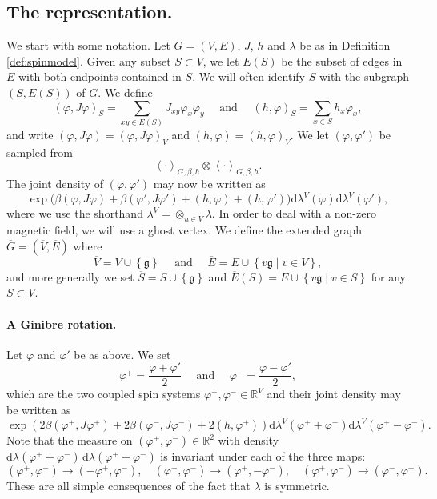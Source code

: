 \documentclass{article}
\numberwithin{equation}{section}
\theoremstyle{definition}
\theoremstyle{definition}
\theoremstyle{remark}
\renewcommand{\d}{\mathrm{d}}
\newcommand\vp{\varphi}
\newcommand\R{\mathbb{R}}
\renewcommand{\d}{\mathrm{d}}
\renewcommand{\l}{\lambda}
\newcommand{\vpp}{\vp^+}
\newcommand{\vpm}{\vp^-}
\newcommand{\g}{\mathfrak{g}}
\begin{document}
\subsection{The representation. }We start with some notation. 
Let $G = (V,E)$, $J$, $h$ and $\l$ be as in Definition \ref{def:spinmodel}.
Given any subset $S \subset V$, we let $E(S)$ be the subset of edges in $E$ with both endpoints contained in $S$. We will often identify $S$ with the subgraph $(S,E(S))$ of $G$. We define
\[
\left( \vp, J \vp \right)_S = \sum_{xy \in E(S)} J_{xy} \vp_x \vp_y \quad\text{ and }\quad (h,\vp)_S = \sum_{x \in S} h_x \vp_x,
\] 
and write $(\vp,J\vp) = (\vp,J\vp)_V$ and $(h,\vp) = (h,\vp)_V$. 
We let $(\vp,\vp')$ be sampled from
\[
\left< \cdot \right>_{G,\beta,h} \otimes \left< \cdot \right>_{G,\beta,h}.
\]
The joint density of $(\vp,\vp')$ may now be written as
\[
	\exp\big( \beta (\vp,J\vp) + \beta (\vp',J\vp') + (h,\vp) + (h,\vp')\big) \d\l^V(\vp)\d\l^V(\vp'),
\] 
where we use the shorthand $\l^V = \otimes_{u \in V} \l$. 
In order to deal with a non-zero magnetic field, we will use a ghost vertex. We define the extended graph $ \overline{G} = ( \overline{V}, \overline{E})$ where 
\[
			\overline{V} = V \cup \left\{ \g \right\} \quad\text{ and }\quad \overline{E} = E \cup \left\{ v\g \mid v \in V \right\},
\]
and more generally we set $ \overline{S} = S \cup \left\{ \g \right\} $ and $ \overline{E}(S) = E \cup \left\{ v\g \mid v \in S \right\}$ for any $S \subset V$. 
\paragraph{A Ginibre rotation. }
Let $\vp$ and $\vp'$ be as above. 
We set
\begin{equation}\label{eq:repdef}
	\vp^+ = \frac{\vp + \vp'}{2} \quad\text{ and }\quad \vp^- = \frac{\vp - \vp'}{2},
\end{equation} 
which are the two coupled spin systems $\vp^+,\vp^-\in \R^V$ and their joint density may be written as 
\begin{equation}\label{eq:rotden}
	\exp( 2\beta (\vpp,J\vpp) + 2\beta (\vpm,J\vpm) + 2(h,\vpp)) \d\l^V(\vpp + \vpm)  \d\l^V(\vpp -  \vpm).
\end{equation} 
Note that the measure on $(\vpp,\vpm) \in \R^2$ with density $\d\l(\vpp + \vpm) \,\d\l(\vpp - \vpm)$ is invariant under each of the three maps:
\[
	(\vpp,\vpm) \to (-\vpp,\vpm), \quad (\vpp,\vpm) \to (\vpp,-\vpm), \quad (\vpp,\vpm) \to (\vpm,\vpp).
\] 
These are all simple consequences of the fact that $\l$ is symmetric. 
\end{document}
